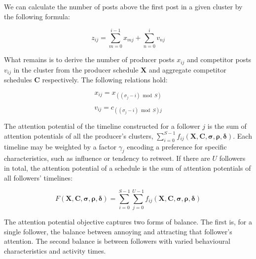 \documentclass[onesided,letterpaper]{tufte-book}
\begin{document}
We can calculate the number of posts above the first post in a given cluster by the following formula:

\begin{equation}
       z_{ij} = \sum_{m = 0}^{i - 1} x_{mj} + \sum_{n = 0}^{i} v_{nj}
\end{equation}

What remains is to derive the number of producer posts $x_{ij}$ and competitor posts $v_{ij}$ in the cluster from the producer schedule $\mathbf{X}$ and aggregate competitor schedules $\mathbf{C}$ respectively. The following relations hold:

\begin{equation}
  x_{ij} = x_{((\sigma_j - i)\bmod{S})} \label{eq:nomenclature-x}
\end{equation}

\begin{equation}
  v_{ij} = c_{((\sigma_j - i)\bmod{S})j} \label{eq:nomenclature-v}
\end{equation}


The attention potential of the timeline constructed for a follower $j$ is the sum of attention potentials of all the producer's clusters, $\sum_{i = 0}^{S-1} f_{ij}(\mathbf{X}, \mathbf{C}, \boldsymbol\sigma, \boldsymbol\rho, \boldsymbol\delta)$. Each timeline may be weighted by a factor $\gamma_j$ encoding a preference for specific characteristics, such as influence or tendency to retweet. If there are $U$ followers in total, the attention potential of a schedule is the sum of attention potentials of all followers' timelines:

\begin{equation}
  F(\mathbf{X}, \mathbf{C}, \boldsymbol\sigma, \boldsymbol\rho, \boldsymbol\delta) = \sum_{i=0}^{S-1} \sum_{j=0}^{U-1} f_{ij}(\mathbf{X}, \mathbf{C}, \boldsymbol\sigma, \boldsymbol\rho, \boldsymbol\delta)
\end{equation}

The attention potential objective captures two forms of balance. The first is, for a single follower, the balance between annoying and attracting that follower's attention. The second balance is between followers with varied behavioural characteristics and activity times.
\end{document}
